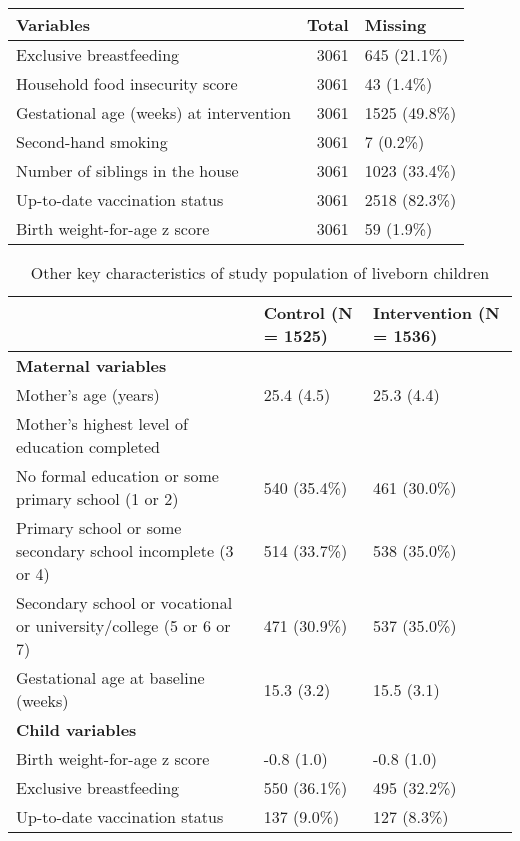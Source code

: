 \documentclass[
]{article}
\begin{document}
\begin{table}[H]
\centering
\begin{tabular}{l|r|l}
\hline
Variables & Total & Missing\\
\hline
Exclusive breastfeeding & 3061 & 645 (21.1\%)\\
\hline
Household food insecurity score & 3061 & 43 (1.4\%)\\
\hline
Gestational age (weeks) at intervention & 3061 & 1525 (49.8\%)\\
\hline
Second-hand smoking & 3061 & 7 (0.2\%)\\
\hline
Number of siblings in the house & 3061 & 1023 (33.4\%)\\
\hline
Up-to-date vaccination status & 3061 & 2518 (82.3\%)\\
\hline
Birth weight-for-age z score & 3061 & 59 (1.9\%)\\
\hline
\end{tabular}
\end{table}

\begin{table}[H]

\caption{\label{tab:unnamed-chunk-5}Other key characteristics of study population of liveborn children}
\centering
\begin{tabular}[t]{l|l|l}
\hline
  & Control (N = 1525) & Intervention (N = 1536)\\
\hline
\textbf{Maternal variables} & \textbf{} & \textbf{}\\
\hline
\hspace{1em}Mother’s age (years) & 25.4 (4.5) & 25.3 (4.4)\\
\hline
\hspace{1em}Mother’s highest level of education completed &  & \\
\hline
\hspace{2em}No formal education or some primary school (1 or 2) & 540 (35.4\%) & 461 (30.0\%)\\
\hline
\hspace{2em}Primary school or some secondary school incomplete (3 or 4) & 514 (33.7\%) & 538 (35.0\%)\\
\hline
\hspace{2em}Secondary school or vocational or university/college (5 or 6 or 7) & 471 (30.9\%) & 537 (35.0\%)\\
\hline
\hspace{1em}Gestational age at baseline (weeks) & 15.3 (3.2) & 15.5 (3.1)\\
\hline
\textbf{Child variables} & \textbf{} & \textbf{}\\
\hline
\hspace{1em}Birth weight-for-age z score & -0.8 (1.0) & -0.8 (1.0)\\
\hline
\hspace{1em}Exclusive breastfeeding & 550 (36.1\%) & 495 (32.2\%)\\
\hline
\hspace{1em}Up-to-date vaccination status & 137  (9.0\%) & 127  (8.3\%)\\
\hline
\end{tabular}
\end{table}
\end{document}
